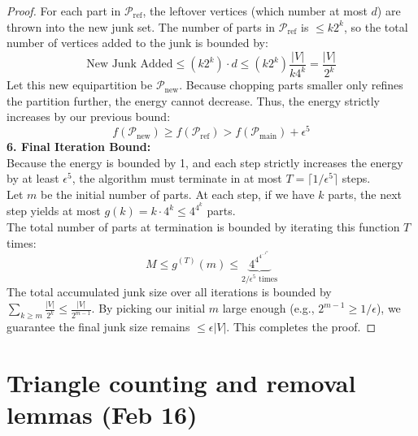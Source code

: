 \documentclass[a4paper]{article}
\begin{document}
\begin{proof}
    For each part in $\mathcal{P}_{\text{ref}}$, the leftover vertices (which number at most $d$) are thrown into the new junk set. The number of parts in $\mathcal{P}_{\text{ref}}$ is $\le k 2^k$, so the total number of vertices added to the junk is bounded by:
    \[
        \text{New Junk Added} \le (k 2^k) \cdot d \le (k 2^k) \frac{|V|}{k 4^k} = \frac{|V|}{2^k}
    \]
    Let this new equipartition be $\mathcal{P}_{\text{new}}$. Because chopping parts smaller only refines the partition further, the energy cannot decrease. Thus, the energy strictly increases by our previous bound:
    \[
        f(\mathcal{P}_{\text{new}}) \ge f(\mathcal{P}_{\text{ref}}) > f(\mathcal{P}_{\text{main}}) + \epsilon^5
    \]
    \textbf{6. Final Iteration Bound:} \\
    Because the energy is bounded by 1, and each step strictly increases the energy by at least $\epsilon^5$, the algorithm must terminate in at most $T = \lceil 1/\epsilon^5 \rceil$ steps. \\
    Let $m$ be the initial number of parts. At each step, if we have $k$ parts, the next step yields at most $g(k) = k \cdot 4^k \le 4^{4^k}$ parts. \\
    The total number of parts at termination is bounded by iterating this function $T$ times:
    \[
        M \le g^{(T)}(m) \le \underbrace{4^{4^{4^{\cdots^{4^m}}}}}_{2/\epsilon^5 \text{ times}}
    \]
    The total accumulated junk size over all iterations is bounded by $\sum_{k \ge m} \frac{|V|}{2^k} \le \frac{|V|}{2^{m-1}}$. By picking our initial $m$ large enough (e.g., $2^{m-1} \ge 1/\epsilon$), we guarantee the final junk size remains $\le \epsilon |V|$. This completes the proof.
\end{proof}

\newpage
\section{Triangle counting and removal lemmas (Feb 16)}
\end{document}
